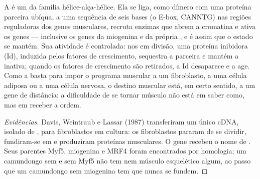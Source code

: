 \begin{proposition}\label{prop:b2:cell-differentiation:myod}
A  é um  da família hélice-alça-hélice. Ela se
liga, como dímero com uma proteína parceira ubíqua, a uma sequência de
seis bases (o E-box, CANNTG) nas regiões reguladoras dos genes
musculares, recruta enzimas que abrem a cromatina e ativa os genes ---
inclusive os genes da miogenina e da própria , e é assim que o
estado se mantém. Sua atividade é controlada: nos  em
divisão, uma proteína inibidora (Id), induzida pelos fatores de
crescimento, sequestra a parceira e mantém a  inativa; quando os
fatores de crescimento são retirados, a Id desaparece e a  age.
Como a  basta para impor o programa muscular a um fibroblasto, a
uma célula adiposa ou a uma célula nervosa, o destino muscular está, em
certo sentido, a um gene de distância: a dificuldade de se tornar
músculo não está em saber como, mas em receber a ordem.
\end{proposition}
\begin{proof}[Evidências]
Davis, Weintraub e Lassar (1987) transferiram um único cDNA, isolado de
, para fibroblastos em cultura: os fibroblastos pararam de se
dividir, fundiram-se em  e produziram proteínas musculares. O
gene recebeu o nome de . Seus parentes Myf5, miogenina e MRF4
foram encontrados por homologia; um camundongo sem  e sem Myf5 não
tem  nem músculo esquelético algum, ao passo que um
camundongo sem miogenina tem  que nunca se fundem.
\end{proof}

